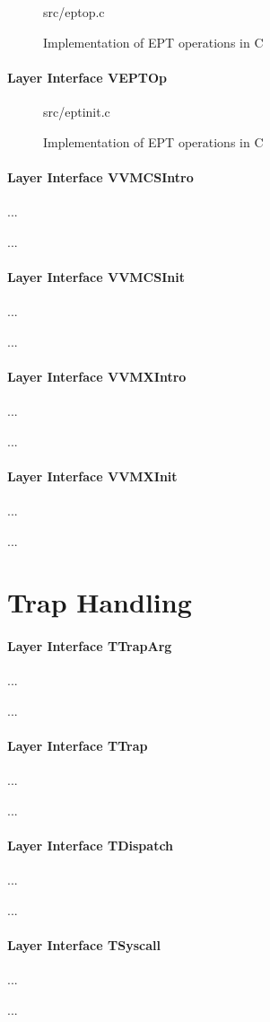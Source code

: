 \begin{figure}
	 {src/eptop.c}
	\caption{Implementation of EPT operations in C}
	\label{fig:eptop_c}
\end{figure}

\paragraph{Layer Interface VEPTOp}

\begin{figure}
	 {src/eptinit.c}
	\caption{Implementation of EPT operations in C}
	\label{fig:eptinit_c}
\end{figure}

\paragraph{Layer Interface VVMCSIntro}
...

...

\paragraph{Layer Interface VVMCSInit}
...

...

\paragraph{Layer Interface VVMXIntro}
...

...

\paragraph{Layer Interface VVMXInit}
...

...

\section{Trap Handling}

\paragraph{Layer Interface TTrapArg}
...

...

\paragraph{Layer Interface TTrap}
...

...

\paragraph{Layer Interface TDispatch}
...

...

\paragraph{Layer Interface TSyscall}
...

...